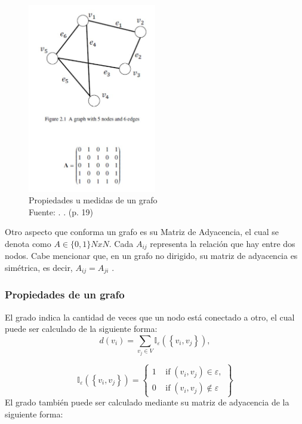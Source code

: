 \begin{figure}[h]
	\begin{center}
		\includegraphics[width=0.5\textwidth]{2/MT/6.jpg}
		\caption{Propiedades u medidas de un grafo \\
			Fuente: \citep*{bk_grafo}. . (p. 19)}
		\label{1:fig2}
	\end{center}
\end{figure}

Otro aspecto que conforma un grafo es su Matriz de Adyacencia, el cual se denota como $A \in \{0, 1\}$$NxN$. Cada $A_{ij}$ representa la relación que hay entre dos nodos. Cabe mencionar que, en un grafo no dirigido, su matriz de adyacencia es simétrica, es decir, $A_{ij} = A_{ji}$  \parencite{bk_grafo}.


\subsubsection{Propiedades de un grafo \parencite{bk_grafo}}
El grado indica la cantidad de veces que un nodo está conectado a otro, el cual puede ser calculado de la siguiente forma:
\begin{equation} 
	d(v_{i}) = \sum_{v_{j}\in V }\mathbb{I}_{\varepsilon}(\left \{v_{i},v_{j}  \right \}) ,
\end{equation}

\begin{equation} 
	\mathbb{I}_{\varepsilon}(\left \{v_{i},v_{j}  \right \}) = \begin{Bmatrix}
		1\;\;\;\; \textrm{if}\;  (v_{i},v_{j}) \in \varepsilon, \\ 
		0\;\;\;\; \textrm{if}\;  (v_{i},v_{j}) \notin \varepsilon
	\end{Bmatrix}
\end{equation}
El grado también puede ser calculado mediante su matriz de adyacencia de la siguiente forma:

